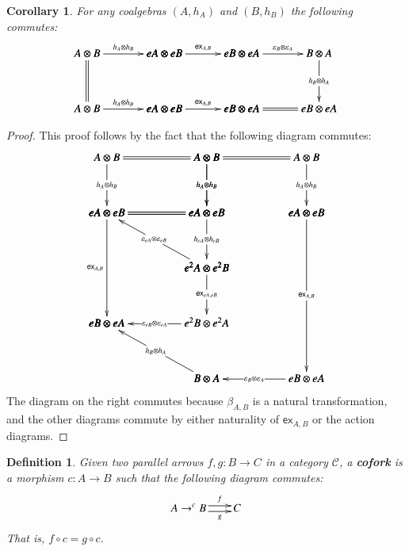 \documentclass{article}
\newtheorem{corollary}[theorem]{Corollary}
\newtheorem{definition}[theorem]{Definition}
\let\mto\to
\let\to\relax
\newcommand{\to}{\rightarrow}
\newcommand{\cat}[1]{\mathcal{#1}}
\newcommand{\e}[1]{\mathsf{ex}_{#1}}
\begin{document}
\begin{corollary}
  \label{corollary:ex-simple}
  For any coalgebras $(A,h_A)$ and $(B,h_B)$ the following commutes:
    \[
    \bfig
    \square|aaaa|/->`=``->/<700,500>[
      A \otimes B`
      eA \otimes eB`
      A \otimes B`
      eA \otimes eB;
      h_A \otimes h_B```
      h_A \otimes h_B]

    \square(700,0)|aaaa|/->```->/<700,500>[
      eA \otimes eB`
      eB \otimes eA`
      eA \otimes eB`
      eB \otimes eA;
      \e{A,B}```
      \e{A,B}]

    \square(1400,0)|aama|/->``->`=/<700,500>[
      eB \otimes eA`
      B \otimes A`
      eB \otimes eA`
      eB \otimes eA;
      \varepsilon_B \otimes \varepsilon_A``
      h_B \otimes h_A`]
      \efig
    \]
\end{corollary}
\begin{proof}
  This proof follows by the fact that the following diagram commutes:
  \[
  \bfig
  \square|mmmm|/=`->`->`=/<900,500>[
    A \otimes B`
    A \otimes B`
    eA \otimes eB`
    eA \otimes eB;`
    h_A \otimes h_B`
    h_A \otimes h_B`]

  \qtriangle(0,-500)|mmm|/=`<-`->/<900,500>[
    eA \otimes eB`
    eA \otimes eB`
    e^2A \otimes e^2B;`
    \varepsilon_{eA} \otimes \varepsilon_{eB}`
    h_{eA} \otimes h_{eB}]

  \dtriangle(0,-1000)|mmm|/`->`<-/<900,500>[
    e^2A \otimes e^2B`
    eB \otimes eA`
    e^2B \otimes e^2A;`
    \e{eA,eB}`
    \varepsilon_{eB} \otimes \varepsilon_{eA}]

  \morphism(0,0)<0,-1000>[eA \otimes eB`eB \otimes eA;\e{A,B}]

  \square(900,0)|mmmm|/=`->`->`/<900,500>[
    A \otimes B`
    A \otimes B`
    eA \otimes eB`
    eA \otimes eB;`
    h_A \otimes h_B`
    h_A \otimes h_B`]

  \dtriangle(900,-1500)|mmm|/`->`<-/<900,1500>[
    eA \otimes eB`
    B \otimes A`
    eB \otimes eA;`
    \e{A,B}`
    \varepsilon_{B} \otimes \varepsilon_A]

  \morphism(900,-1500)|m|<-900,500>[B \otimes A`eB \otimes eA;h_B \otimes h_A]
  \efig
  \]
  The diagram on the right commutes because $\beta_{A,B}$ is a natural
  transformation, and the other diagrams commute by either naturality
  of $\e{A,B}$ or the action diagrams.
\end{proof}

\begin{definition}
  \label{def:cofork}
  Given two parallel arrows $f,g : B \mto C$ in a category $\cat{C}$,
  a \textbf{cofork} is a morphism $c : A \mto B$ such that
  the following diagram commutes:
  \[
  A \mto^c B \two^f_g C
  \]
  That is, $f \circ c = g \circ c$.
\end{definition}
\end{document}
